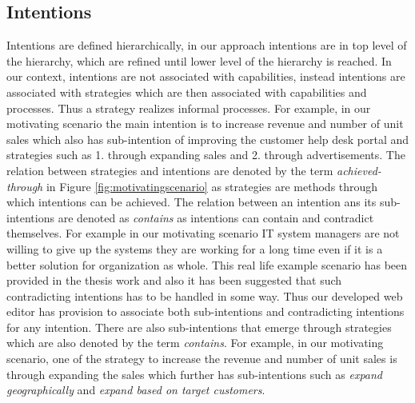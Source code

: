 \subsection{Intentions} 
\label{sec:intentions}
Intentions are defined hierarchically, in our approach intentions are in top level of the hierarchy, which are refined until lower level of the hierarchy is reached. In our context, intentions are not associated with capabilities, instead intentions are associated with strategies which are then associated with capabilities and processes. Thus a strategy realizes informal processes. For example, in our motivating scenario the main intention is to increase revenue and number of unit sales which also has sub-intention of improving the customer help desk portal and strategies such as 1. through expanding sales and 2. through advertisements. The relation between strategies and intentions are denoted by the term \textit{achieved-through} in Figure \ref{fig:motivatingscenario} as strategies are methods through which intentions can be achieved. The relation between an intention ans its sub-intentions are denoted as \textit{contains} as intentions can contain and contradict themselves. For example in our motivating scenario IT system managers are not willing to give up the systems they are working for a long time even if it is a better solution for organization as whole. This real life example scenario has been provided in the thesis work \cite{Sierr2015} and also it has been suggested that such contradicting intentions has to be handled in some way. Thus our developed web editor has provision to associate both sub-intentions and contradicting intentions for any intention. There are also sub-intentions that emerge through strategies which are also denoted by the term \textit{contains}. For example, in our motivating scenario, one of the strategy to increase the revenue and number of unit sales is through expanding the sales which further has sub-intentions such as \textit{expand geographically} and \textit{expand based on target customers}. 

